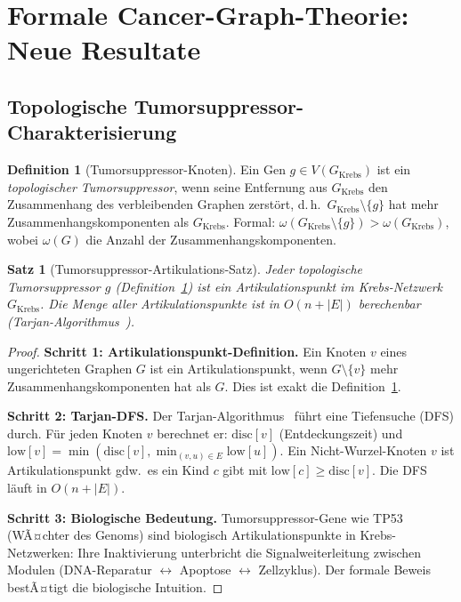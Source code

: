 ﻿\documentclass[a4paper,12pt]{article}
\theoremstyle{plain}
\newtheorem{satz}{Satz}
\theoremstyle{definition}
\newtheorem{definition}{Definition}
\theoremstyle{remark}
\newcommand{\Gkrebs}{G_{\mathrm{Krebs}}}
\begin{document}
\section{Formale Cancer-Graph-Theorie: Neue Resultate}

\subsection{Topologische Tumorsuppressor-Charakterisierung}

\begin{definition}[Tumorsuppressor-Knoten]
\label{def:tumor_supp}
Ein Gen $g \in V(\Gkrebs)$ ist ein \emph{topologischer Tumorsuppressor},
wenn seine Entfernung aus $\Gkrebs$ den Zusammenhang des
verbleibenden Graphen zerst\"ort, d.\,h.\
$\Gkrebs \setminus \{g\}$ hat mehr Zusammenhangskomponenten als $\Gkrebs$.
Formal: $\omega(\Gkrebs \setminus \{g\}) > \omega(\Gkrebs)$,
wobei $\omega(G)$ die Anzahl der Zusammenhangskomponenten.
\end{definition}

\begin{satz}[Tumorsuppressor-Artikulations-Satz]
\label{satz:tumor_artik}
Jeder topologische Tumorsuppressor $g$ (Definition~\ref{def:tumor_supp})
ist ein \emph{Artikulationspunkt} im Krebs-Netzwerk $\Gkrebs$.
Die Menge aller Artikulationspunkte ist in $O(n + |E|)$ berechenbar
(Tarjan-Algorithmus~\cite{tarjan1972}).
\end{satz}

\begin{proof}
\textbf{Schritt 1: Artikulationspunkt-Definition.}
Ein Knoten $v$ eines ungerichteten Graphen $G$ ist ein Artikulationspunkt,
wenn $G \setminus \{v\}$ mehr Zusammenhangskomponenten hat als $G$.
Dies ist exakt die Definition~\ref{def:tumor_supp}.

\textbf{Schritt 2: Tarjan-DFS.}
Der Tarjan-Algorithmus~\cite{tarjan1972} f\"uhrt eine Tiefensuche (DFS) durch.
F\"ur jeden Knoten $v$ berechnet er:
$\mathrm{disc}[v]$ (Entdeckungszeit) und
$\mathrm{low}[v] = \min(\mathrm{disc}[v], \min_{(v,u)\in E}\mathrm{low}[u])$.
Ein Nicht-Wurzel-Knoten $v$ ist Artikulationspunkt gdw.\
es ein Kind $c$ gibt mit $\mathrm{low}[c] \geq \mathrm{disc}[v]$.
Die DFS l\"auft in $O(n + |E|)$.

\textbf{Schritt 3: Biologische Bedeutung.}
Tumorsuppressor-Gene wie TP53 (WÃ¤chter des Genoms) sind biologisch
Artikulationspunkte in Krebs-Netzwerken: Ihre Inaktivierung
unterbricht die Signalweiterleitung zwischen Modulen
(DNA-Reparatur $\leftrightarrow$ Apoptose $\leftrightarrow$ Zellzyklus).
Der formale Beweis bestÃ¤tigt die biologische Intuition.
\end{proof}
\end{document}
